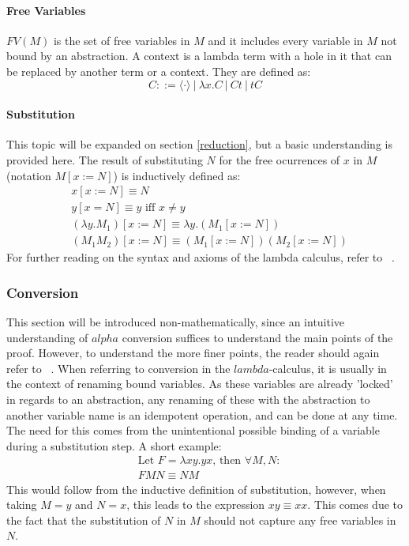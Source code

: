\documentclass[12pt]{article}
\begin{document}
\paragraph{Free Variables} $FV(M)$ is the set of free variables in $M$ and it includes every variable in $M$ not bound by an abstraction.
A context is a lambda term with a hole in it that can be replaced by another term or a context. They are defined as:
\begin{equation}
C ::= \langle \cdot \rangle \ | \ \lambda x.C \ | \ Ct \ | \ tC
\end{equation}
\paragraph{Substitution} This topic will be expanded on section \ref{reduction}, but a basic understanding is provided here.
The result of substituting $N$ for the free ocurrences of $x$ in $M$ (notation $M[x:= N]$) is inductively defined as:
\begin{equation}
  \begin{split}
    & x [x := N] \equiv N \\
    & y [ x=N ] \equiv y \text{ iff } x \neq y \\
    & (\lambda y.M_{1})[ x:=N ] \equiv \lambda y. ( M_{1} [ x:=N ] ) \\
    & (M_{1}M_{2})[x:=N] \equiv (M_{1}[x:=N])(M_{2}[x:=N])
  \end{split}
\end{equation}
For further reading on the syntax and axioms of the lambda calculus, refer to ~\cite{barendregt1984lambda}.

\subsubsection{Conversion}
This section will be introduced non-mathematically, since an intuitive understanding of $alpha$ conversion suffices to understand the main points of the proof. However, to understand the more finer points, the reader should again refer to ~\cite{barendregt1984lambda}.
When referring to conversion in the $lambda$-calculus, it is usually in the context of renaming bound variables. As these variables are already 'locked' in regards to an abstraction, any renaming of these with the abstraction to another variable name is an idempotent operation, and can be done at any time.
The need for this comes from the unintentional possible binding of a variable during a substitution step. A short example:
\begin{equation}
  \begin{split}
    & \text{Let } F = \lambda xy.yx \text{, then } \forall M, N: \\
    & FMN \equiv NM
  \end{split}
\end{equation}
This would follow from the inductive definition of substitution, however, when taking $M = y$ and $N = x$, this leads to the expression $xy \equiv xx$.
This comes due to the fact that the substitution of $N$ in $M$ should not capture any free variables in $N$.
\end{document}
